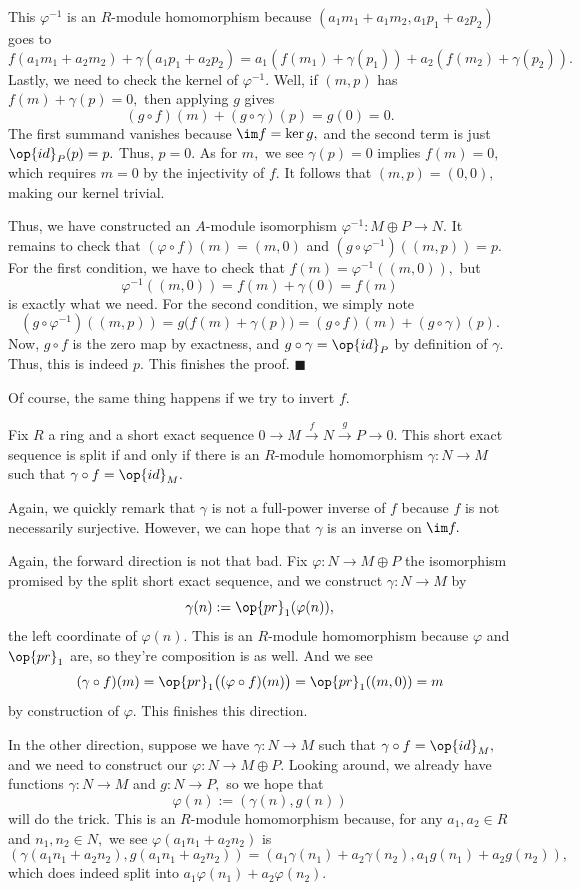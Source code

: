 This $\varphi^{-1}$ is an $R$-module homomorphism because $(a_1m_1+a_1m_2,a_1p_1+a_2p_2)$ goes to
\[f(a_1m_1+a_2m_2)+\gamma(a_1p_1+a_2p_2)=a_1(f(m_1)+\gamma(p_1))+a_2(f(m_2)+\gamma(p_2)).\]
Lastly, we need to check the kernel of $\varphi^{-1}.$ Well, if $(m,p)$ has $f(m)+\gamma(p)=0,$ then applying $g$ gives
\[(g\circ f)(m)+(g\circ\gamma)(p)=g(0)=0.\]
The first summand vanishes because $\im f=\ker g,$ and the second term is just $\op{id}_P(p)=p.$ Thus, $p=0.$ As for $m,$ we see $\gamma(p)=0$ implies $f(m)=0,$ which requires $m=0$ by the injectivity of $f.$ It follows that $(m,p)=(0,0),$ making our kernel trivial.

Thus, we have constructed an $A$-module isomorphism $\varphi^{-1}:M\oplus P\to N.$ It remains to check that $(\varphi\circ f)(m)=(m,0)$ and $(g\circ\varphi^{-1})((m,p))=p.$ For the first condition, we have to check that $f(m)=\varphi^{-1}((m,0)),$ but
\[\varphi^{-1}((m,0))=f(m)+\gamma(0)=f(m)\]
is exactly what we need. For the second condition, we simply note
\[(g\circ\varphi^{-1})((m,p))=g\big(f(m)+\gamma(p)\big)=(g\circ f)(m)+(g\circ\gamma)(p).\]
Now, $g\circ f$ is the zero map by exactness, and $g\circ\gamma=\op{id}_P$ by definition of $\gamma.$ Thus, this is indeed $p.$ This finishes the proof. $\blacksquare$

Of course, the same thing happens if we try to invert $f.$
\begin{proposition}
    Fix $R$ a ring and a short exact sequence $0\to M\stackrel f\to N\stackrel g\to P\to0.$ This short exact sequence is split if and only if there is an $R$-module homomorphism $\gamma:N\to M$ such that $\gamma\circ f=\op{id}_M.$
\end{proposition}
Again, we quickly remark that $\gamma$ is not a full-power inverse of $f$ because $f$ is not necessarily surjective. However, we can hope that $\gamma$ is an inverse on $\im f.$

Again, the forward direction is not that bad. Fix $\varphi:N\to M\oplus P$ the isomorphism promised by the split short exact sequence, and we construct $\gamma:N\to M$ by
\[\gamma(n):=\op{pr}_1(\varphi(n)),\]
the left coordinate of $\varphi(n).$ This is an $R$-module homomorphism because $\varphi$ and $\op{pr}_1$ are, so they're composition is as well. And we see
\[(\gamma\circ f)(m)=\op{pr}_1\big((\varphi\circ f)(m)\big)=\op{pr}_1((m,0))=m\]
by construction of $\varphi.$ This finishes this direction.

In the other direction, suppose we have $\gamma:N\to M$ such that $\gamma\circ f=\op{id}_M,$ and we need to construct our $\varphi:N\to M\oplus P.$ Looking around, we already have functions $\gamma:N\to M$ and $g:N\to P,$ so we hope that
\[\varphi(n):=(\gamma(n),g(n))\]
will do the trick. This is an $R$-module homomorphism because, for any $a_1,a_2\in R$ and $n_1,n_2\in N,$ we see $\varphi(a_1n_1+a_2n_2)$ is
\[(\gamma(a_1n_1+a_2n_2),g(a_1n_1+a_2n_2))=(a_1\gamma(n_1)+a_2\gamma(n_2),a_1g(n_1)+a_2g(n_2)),\]
which does indeed split into $a_1\varphi(n_1)+a_2\varphi(n_2).$

